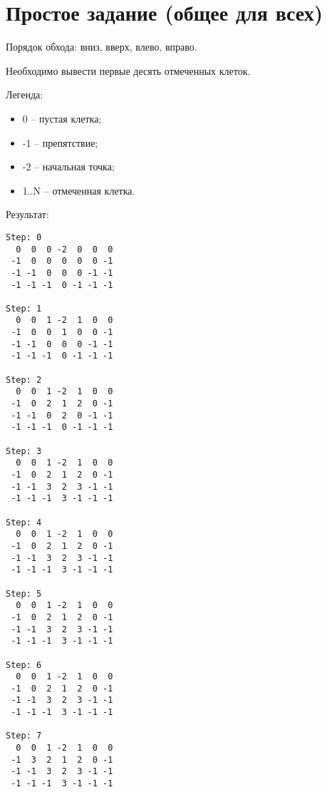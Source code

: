 \section{Простое задание (общее для всех)}

Порядок обхода: вниз, вверх, влево, вправо.

Необходимо вывести первые десять отмеченных клеток.

Легенда:
\begin{itemize}
	\item 0 -- пустая клетка;
	\item -1 -- препятствие;
	\item -2 -- начальная точка;
	\item 1..N -- отмеченная клетка.
\end{itemize}

Результат:

\begin{verbatim}
Step: 0
  0  0  0 -2  0  0  0
 -1  0  0  0  0  0 -1
 -1 -1  0  0  0 -1 -1
 -1 -1 -1  0 -1 -1 -1

Step: 1
  0  0  1 -2  1  0  0
 -1  0  0  1  0  0 -1
 -1 -1  0  0  0 -1 -1
 -1 -1 -1  0 -1 -1 -1

Step: 2
  0  0  1 -2  1  0  0
 -1  0  2  1  2  0 -1
 -1 -1  0  2  0 -1 -1
 -1 -1 -1  0 -1 -1 -1

Step: 3
  0  0  1 -2  1  0  0
 -1  0  2  1  2  0 -1
 -1 -1  3  2  3 -1 -1
 -1 -1 -1  3 -1 -1 -1

Step: 4
  0  0  1 -2  1  0  0
 -1  0  2  1  2  0 -1
 -1 -1  3  2  3 -1 -1
 -1 -1 -1  3 -1 -1 -1

Step: 5
  0  0  1 -2  1  0  0
 -1  0  2  1  2  0 -1
 -1 -1  3  2  3 -1 -1
 -1 -1 -1  3 -1 -1 -1

Step: 6
  0  0  1 -2  1  0  0
 -1  0  2  1  2  0 -1
 -1 -1  3  2  3 -1 -1
 -1 -1 -1  3 -1 -1 -1

Step: 7
  0  0  1 -2  1  0  0
 -1  3  2  1  2  0 -1
 -1 -1  3  2  3 -1 -1
 -1 -1 -1  3 -1 -1 -1

\end{verbatim}

